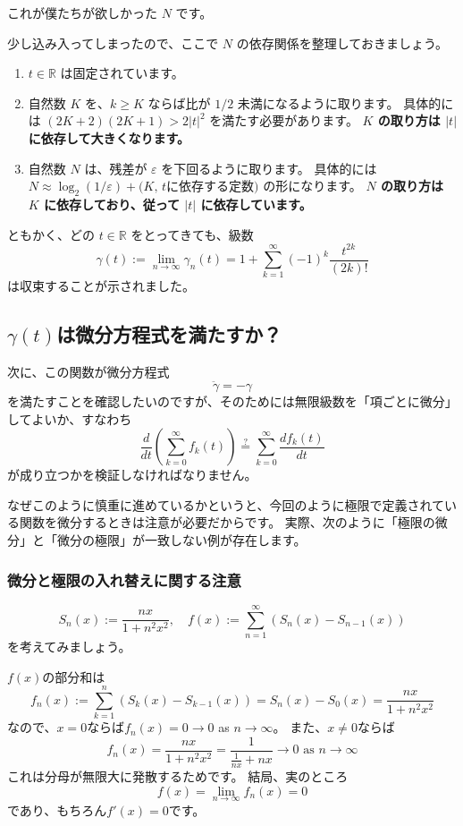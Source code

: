 これが僕たちが欲しかった $N$ です。

少し込み入ってしまったので、ここで $N$ の依存関係を整理しておきましょう。
\begin{enumerate}
  \item $t\in\mathbb{R}$ は固定されています。
  \item 自然数 $K$ を、$k \ge K$ ならば比が $1/2$ 未満になるように取ります。
  具体的には $(2K+2)(2K+1) > 2|t|^2$ を満たす必要があります。
  \textbf{$K$ の取り方は $|t|$ に依存して大きくなります。}
  \item 自然数 $N$ は、残差が $\varepsilon$ を下回るように取ります。
  具体的には $N \approx \log_2(1/\varepsilon) + \text{($K$, $t$に依存する定数)}$ の形になります。
  \textbf{$N$ の取り方は $K$ に依存しており、従って $|t|$ に依存しています。}
\end{enumerate}

ともかく、どの $t\in\mathbb{R}$ をとってきても、級数
\[
  \gamma(t) := \lim_{n\to\infty}\gamma_n(t) = 1+\sum_{k=1}^{\infty}(-1)^k\frac{t^{2k}}{(2k)!}
\]
は収束することが示されました。

\subsection{$\gamma(t)$は微分方程式を満たすか？}

次に、この関数が微分方程式
\[
  \ddot{\gamma}=-\gamma
\]
を満たすことを確認したいのですが、そのためには無限級数を「項ごとに微分」してよいか、すなわち
\[
  \frac{d}{dt}\left(\sum_{k=0}^\infty f_k(t)\right)\overset{?}{=}\sum_{k=0}^\infty \frac{df_k(t)}{dt}
\]
が成り立つかを検証しなければなりません。

なぜこのように慎重に進めているかというと、今回のように極限で定義されている関数を微分するときは注意が必要だからです。
実際、次のように「極限の微分」と「微分の極限」が一致しない例が存在します。

\subsubsection*{微分と極限の入れ替えに関する注意}

\[
  S_n(x):=\frac{nx}{1+n^2x^2},\quad f(x):=\sum_{n=1}^\infty(S_n(x)-S_{n-1}(x))
\]
を考えてみましょう。

$f(x)$の部分和は
\[
  f_n(x):=\sum_{k=1}^n(S_k(x)-S_{k-1}(x))=S_n(x)-S_0(x)=\frac{nx}{1+n^2x^2}
\]
なので、$x=0$ならば$f_n(x)=0\to0$ as $n\to\infty$。
また、$x\neq0$ならば
\[
  f_n(x)=\frac{nx}{1+n^2x^2}=\frac{1}{\frac1{nx}+nx}\to0 \text{ as } n\to\infty
\]
これは分母が無限大に発散するためです。
結局、実のところ
\[
  f(x)=\lim_{n\to\infty}f_n(x)=0
\]
であり、もちろん$f'(x)=0$です。

